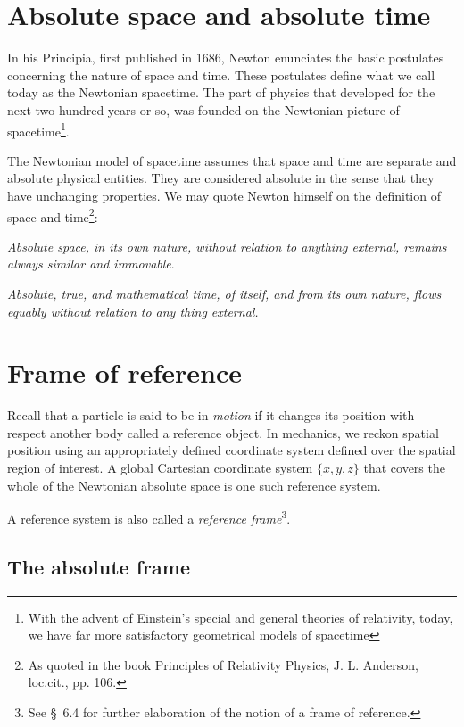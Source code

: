 \section{Absolute space and absolute time}

In his {Principia}, first published in 1686, Newton 
enunciates the basic postulates concerning {the nature 
of 
space and time}. These postulates define what we call 
today 
as the Newtonian spacetime. The part of physics that 
developed for the next two hundred years or so, was 
founded 
on the Newtonian picture of spacetime\footnote{With 
the 
advent of Einstein's special and general theories of 
relativity, today, we have far more satisfactory 
geometrical 
models of spacetime}.

The Newtonian model of spacetime assumes that space and
time are separate and absolute physical entities. They 
are 
considered absolute in the sense that they have 
unchanging
properties. We may quote Newton himself on the 
definition of
space and time\footnote{As quoted in the book 
{Principles of
Relativity Physics}, J. L. Anderson, loc.cit., pp. 
106.}:

{}
\textit{Absolute space, in its own nature, without 
relation
to anything external, remains always similar and
immovable}.

\textit{Absolute, true, and
mathematical time, of itself, and from its own nature, 
flows
equably without relation to any thing external.}

\section{Frame of reference}

Recall that a particle is said to be in \textsl{motion} 
if
it changes its position with respect another body 
called a
reference object. In mechanics, we reckon spatial 
position
using an appropriately defined coordinate system 
defined
over the spatial region of interest. A global Cartesian
coordinate system $\{x,y,z\}$ that covers the whole of 
the
Newtonian absolute space is one such reference system. 
 
A reference system is also called a \textsl{reference 
frame}\footnote{See \S~6.4 for further elaboration of 
the notion of a frame of reference.}.

\subsection{The absolute frame}

